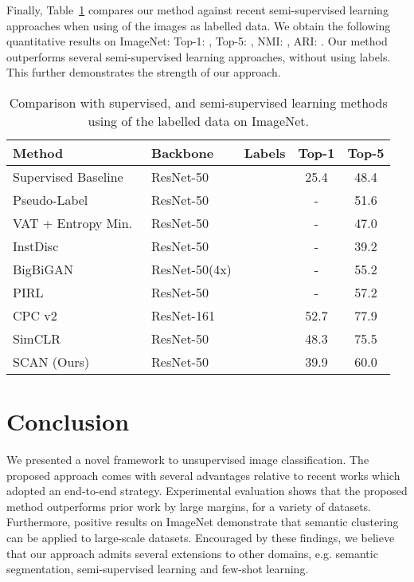 \documentclass[runningheads]{llncs}
\newcommand{\xmark}{\ding{55}}
\begin{document}
Finally, Table~\ref{table: imagenet} compares our method against recent semi-supervised learning approaches when using  of the images as labelled data. We obtain the following quantitative results on ImageNet: Top-1: , Top-5: , NMI: , ARI: . Our method outperforms several semi-supervised learning approaches, without using labels. This further demonstrates the strength of our approach. 

\setlength{\tabcolsep}{4pt}
\begin{table}
\begin{center}
\caption{Comparison with supervised, and semi-supervised learning methods using  of the labelled data on ImageNet.}
\label{table: imagenet}
\scriptsize
\begin{tabular}{@{}l l ccc@{}}
\toprule
\textbf{Method} & \textbf{Backbone} & \textbf{Labels} & \textbf{Top-1} & \textbf{Top-5} \\
\midrule
Supervised Baseline & ResNet-50 &  & 25.4 & 48.4 \\
Pseudo-Label & ResNet-50 &  & - & 51.6 \\
VAT + Entropy Min.~\cite{zhai2019s4l} & ResNet-50 &  & - & 47.0 \\
InstDisc~\cite{wu2018unsupervised} & ResNet-50 &  & - & 39.2 \\
BigBiGAN~\cite{donahue2019large} & ResNet-50(4x) &  & - & 55.2 \\
PIRL~\cite{PIRL} & ResNet-50 &  & - & 57.2 \\
CPC v2~\cite{henaff2019data} & ResNet-161 &  & 52.7 & 77.9 \\
SimCLR~\cite{chen2020simple} & ResNet-50 &  & 48.3 & 75.5 \\
\midrule
SCAN (Ours) & ResNet-50 & \xmark & 39.9 & 60.0 \\
\bottomrule
\end{tabular}
\end{center}
\end{table}
\setlength{\tabcolsep}{1.4pt}
 \section{Conclusion}
\label{sec:conclusion}
We presented a novel framework to unsupervised image classification. The proposed approach comes with several advantages relative to recent works which adopted an end-to-end strategy. Experimental evaluation shows that the proposed method outperforms prior work by large margins, for a variety of datasets. Furthermore, positive results on ImageNet demonstrate that semantic clustering can be applied to large-scale datasets. Encouraged by these findings, we believe that our approach admits several extensions to other domains, e.g. semantic segmentation, semi-supervised learning and few-shot learning. 
\end{document}
